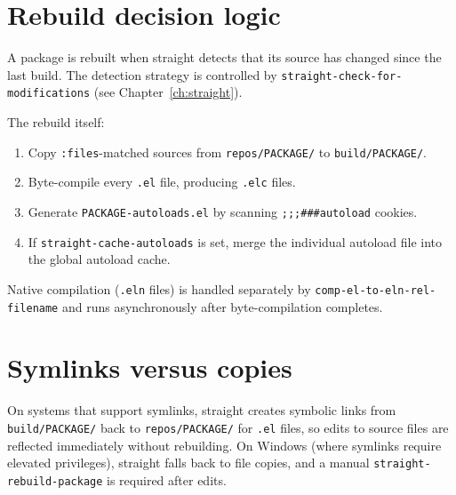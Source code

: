 \section{Rebuild decision logic}

A package is rebuilt when straight detects that its source has
changed since the last build.  The detection strategy is
controlled by \texttt{straight-check-for-modifications}
(see Chapter~\ref{ch:straight}).

The rebuild itself:

\begin{enumerate}
  \item Copy \texttt{:files}-matched sources from
    \texttt{repos/PACKAGE/} to \texttt{build/PACKAGE/}.
  \item Byte-compile every \texttt{.el} file, producing \texttt{.elc}
    files.
  \item Generate \texttt{PACKAGE-autoloads.el} by scanning
    \texttt{;;;\#\#\#autoload} cookies.
  \item If \texttt{straight-cache-autoloads} is set, merge the
    individual autoload file into the global autoload cache.
\end{enumerate}

Native compilation (\texttt{.eln} files) is handled separately by
\texttt{comp-el-to-eln-rel-filename} and runs asynchronously after
byte-compilation completes.

\section{Symlinks versus copies}

On systems that support symlinks, straight creates symbolic links
from \texttt{build/PACKAGE/} back to \texttt{repos/PACKAGE/} for
\texttt{.el} files, so edits to source files are reflected
immediately without rebuilding.  On Windows (where symlinks
require elevated privileges), straight falls back to file copies,
and a manual \texttt{straight-rebuild-package} is required after
edits.
